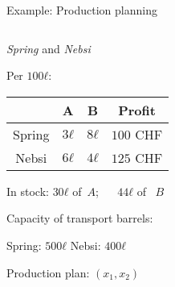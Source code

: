\begin{frame}{Example: Production planning} 

  \begin{columns}
    \begin{column}{.5\textwidth}
      \emph{Spring} and \emph{Nebsi}

      \medskip 
      Per $100 ℓ$:  
      \begin{tabular}{c|c|c|c}
        &  A &  B & Profit  \\\hline
        Spring      & $3ℓ$          & $8ℓ$ & $100$ CHF\\\hline 
        Nebsi      & $6ℓ$           & $4ℓ$ & $125$ CHF
      \end{tabular}

      \medskip

      In stock: $30ℓ$ of~$A$; ~~ $44ℓ$ of ~$B$

       \bigskip

       Capacity of transport barrels:

       \medskip 
       Spring: $500 ℓ$    Nebsi: $400ℓ$  

       \bigskip

       Production plan: $(x_1,x_2)$ 
    \end{column}
    \begin{column}{.5\textwidth}
      
    \end{column}       
  \end{columns}
\end{frame}





